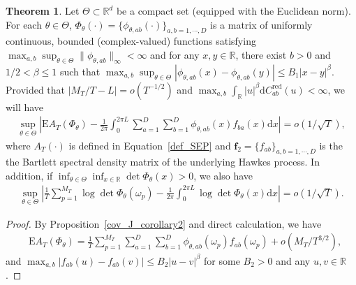 \documentclass[11pt]{article}
\numberwithin{equation}{section}
\theoremstyle{plain}
\theoremstyle{definition}
\theoremstyle{definition}
\theoremstyle{assumption}
\theoremstyle{proposition}
\theoremstyle{proposition}
\theoremstyle{example}
\theoremstyle{lemma}
\theoremstyle{theorem}
\newtheorem{theorem}{Theorem}[section]
\theoremstyle{remark}
\begin{document}
\begin{theorem}\label{deterministic_conv_rate_thm}
Let $\Theta\subset \mathbb{R}^d$ be a compact set (equipped with the Euclidean norm). For each $\theta\in\Theta$, $\Phi_{\theta}(\cdot)=\{\phi_{\theta, ab}(\cdot)\}_{a,b=1,\cdots,D}$ is a matrix of uniformly continuous, bounded (complex-valued) functions satisfying $\max_{a,b}\sup_{\theta\in\Theta}\|\phi_{\theta, ab}\|_{\infty}< \infty$ and for any $x,y\in\mathbb{R}$, there exist $b>0$ and $1/2<\beta\leqslant1$ such that $\max_{a,b}\sup_{\theta\in\Theta}|\phi_{\theta, ab}(x) - \phi_{\theta, ab}(y)|\leqslant B_1|x-y|^{\beta}$. Provided that $|M_T/T - L| = o(T^{-1/2})$ and $\max_{a,b}\int_{\mathbb{R}}|u|^{\beta}\mathrm{d}C_{ab}^{\mathrm{red}}(u)<\infty$, we will have
\begin{align}\label{E_weighted_periodogram_conv_rate_eqn}
\sup_{\theta\in\Theta}\left|\mathrm{E}A_T(\Phi_{\theta}) - \frac{1}{2\pi}\int_0^{2\pi L}\sum_{a=1}^D\sum_{b=1}^D\phi_{\theta, ab}(x)f_{ba}(x)\mathrm{d}x \right|
= o(1/\sqrt{T}),
\end{align}
where $A_T(\cdot)$ is defined in Equation~\ref{def_SEP} and $\boldsymbol{f}_2 = \{f_{ab}\}_{a,b=1,\cdots,D}$ is the the Bartlett spectral density matrix of the underlying Hawkes process. In addition, if $\inf_{\theta\in\Theta}\inf_{x\in\mathbb{R}}\det\Phi_{\theta}(x)>0$, we also have
\begin{align}\label{log_phi_conv_rate_eqn}
\sup_{\theta\in\Theta}\left|\frac{1}{T}\sum_{p=1}^{M_T}\log\det\Phi_{\theta}(\omega_p)
- \frac{1}{2\pi}\int_0^{2\pi L}\log\det\Phi_{\theta}(x)\mathrm{d}x \right|
= o(1/\sqrt{T}).
\end{align}
\begin{proof}
By Proposition~\ref{cov_J_corollary2} and direct calculation, we have
\begin{align*}
&\mathrm{E}A_T(\Phi_{\theta})
=\frac{1}{T}\sum_{p=1}^{M_T}\sum_{a=1}^D\sum_{b=1}^D\phi_{\theta, ab}(\omega_p)f_{ab}(\omega_p)
+o(M_T/T^{3/2}) ,
\end{align*}
and $\max_{a,b}|f_{ab}(u) - f_{ab}(v)|\leqslant B_2|u-v|^{\beta}$ for some $B_2>0$ and any $u,v\in\mathbb{R}$.


\end{proof}
\end{theorem}
\end{document}
